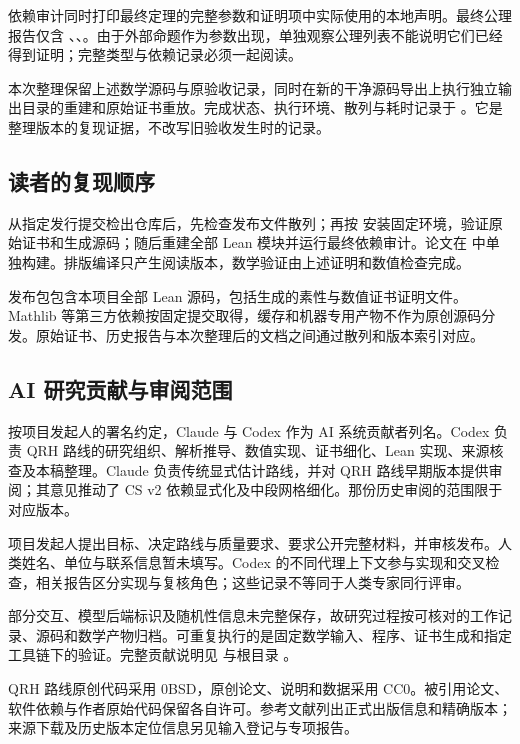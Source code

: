 依赖审计同时打印最终定理的完整参数和证明项中实际使用的本地声明。最终公理报告仅含 、、。由于外部命题作为参数出现，单独观察公理列表不能说明它们已经得到证明；完整类型与依赖记录必须一起阅读。

本次整理保留上述数学源码与原验收记录，同时在新的干净源码导出上执行独立输出目录的重建和原始证书重放。完成状态、执行环境、散列与耗时记录于 。它是整理版本的复现证据，不改写旧验收发生时的记录。

\subsection{读者的复现顺序}
从指定发行提交检出仓库后，先检查发布文件散列；再按  安装固定环境，验证原始证书和生成源码；随后重建全部 Lean 模块并运行最终依赖审计。论文在  中单独构建。排版编译只产生阅读版本，数学验证由上述证明和数值检查完成。

发布包包含本项目全部 Lean 源码，包括生成的素性与数值证书证明文件。Mathlib 等第三方依赖按固定提交取得，缓存和机器专用产物不作为原创源码分发。原始证书、历史报告与本次整理后的文档之间通过散列和版本索引对应。

\subsection{AI 研究贡献与审阅范围}
按项目发起人的署名约定，Claude 与 Codex 作为 AI 系统贡献者列名。Codex 负责 QRH 路线的研究组织、解析推导、数值实现、证书细化、Lean 实现、来源核查及本稿整理。Claude 负责传统显式估计路线，并对 QRH 路线早期版本提供审阅；其意见推动了 CS v2 依赖显式化及中段网格细化。那份历史审阅的范围限于对应版本。

项目发起人提出目标、决定路线与质量要求、要求公开完整材料，并审核发布。人类姓名、单位与联系信息暂未填写。Codex 的不同代理上下文参与实现和交叉检查，相关报告区分实现与复核角色；这些记录不等同于人类专家同行评审。

部分交互、模型后端标识及随机性信息未完整保存，故研究过程按可核对的工作记录、源码和数学产物归档。可重复执行的是固定数学输入、程序、证书生成和指定工具链下的验证。完整贡献说明见  与根目录 。

QRH 路线原创代码采用 0BSD，原创论文、说明和数据采用 CC0。被引用论文、软件依赖与作者原始代码保留各自许可。参考文献列出正式出版信息和精确版本；来源下载及历史版本定位信息另见输入登记与专项报告。
